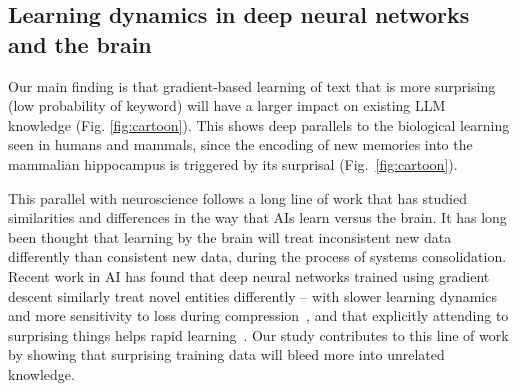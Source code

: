 \documentclass[11pt, a4paper, logo, copyright]{googledeepmind}
\theoremstyle{plain}
\theoremstyle{definition}
\theoremstyle{remark}
\begin{document}
 
 



 

 

\subsection{Learning dynamics in deep neural networks and the brain}


Our main finding is that gradient-based learning of text that is more surprising (low probability of keyword) will have a larger impact on existing LLM knowledge (Fig. \ref{fig:cartoon}). This shows deep parallels to the biological learning seen in humans and mammals, since the encoding of new memories into the mammalian hippocampus is triggered by its surprisal \citep{akiko, morris} (Fig.~\ref{fig:cartoon}). 

This parallel with neuroscience follows a long line of work \citep{syscon, mcnaughton_sys_con, mcclelland_sys_con, review_sys_con} that has studied similarities and differences in the way that AIs learn versus the brain. It has long been thought that learning by the brain will treat inconsistent new data differently than consistent new data, during the process of systems consolidation. Recent work in AI has found that deep neural networks trained using gradient descent similarly treat novel entities differently -- with slower learning dynamics~\citep{syscon} and more sensitivity to loss during compression~\citep{hooker_syscon}, and that explicitly attending to surprising things helps rapid learning~\citep{dileep}. Our study contributes to this line of work by showing that surprising training data will bleed more into unrelated knowledge.
\end{document}
